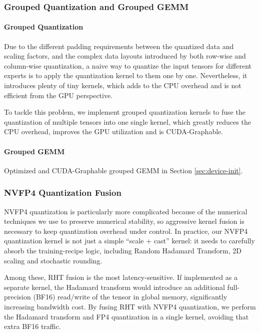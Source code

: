 \documentclass[10pt,logo,copyright]{nvidiatechreport}
\begin{document}

\subsubsection{Grouped Quantization and Grouped GEMM}

\paragraph{Grouped Quantization}

Due to the different padding requirements between the quantized data and scaling factors, and the complex data layouts introduced by both row-wise and column-wise quantization, a naive way to quantize the input tensors for different experts is to apply the quantization kernel to them one by one. Nevertheless, it introduces plenty of tiny kernels, which adds to the CPU overhead and is not efficient from the GPU perspective.

To tackle this problem, we implement grouped quantization kernels to fuse the quantization of multiple tensors into one single kernel, which greatly reduces the CPU overhead, improves the GPU utilization and is CUDA-Graphable.

\paragraph{Grouped GEMM}
Optimized and CUDA-Graphable grouped GEMM in Section \ref{sec:device-init}.


\subsubsection{NVFP4 Quantization Fusion}\label{sec:fp4-quant-fusion}

NVFP4 quantization is particularly more complicated because of the numerical techniques we use to preserve numerical stability, so aggressive kernel fusion is necessary to keep quantization overhead under control. In practice, our NVFP4 quantization kernel is not just a simple “scale + cast” kernel: it needs to carefully absorb the training-recipe logic, including Random Hadamard Transform, 2D scaling and stochastic rounding. 

Among these, RHT fusion is the most latency-sensitive. If implemented as a separate kernel, the Hadamard transform would introduce an additional full-precision (BF16) read/write of the tensor in global memory, significantly increasing bandwidth cost. By fusing RHT with NVFP4 quantization, we perform the Hadamard transform and FP4 quantization in a single kernel, avoiding that extra BF16 traffic.
\end{document}
